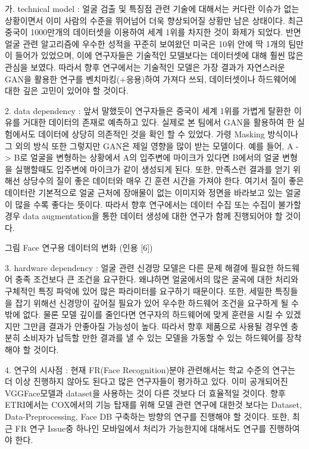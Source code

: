 \documentclass{oblivoir}
\begin{document}
가. technical model : 얼굴 검출 및 특징점 관련 기술에 대해서는 커다란 이슈가 없는 상황이면서 이미 사람의 수준을 뛰어넘어 더욱 향상되어질 상황만 남은 상태이다. 최근 중국이 1000만개의 데이터셋을 이용하여 세계 1위를 차지한 것이 화제가 되었다. 반면 얼굴 관련 알고리즘에 우수한 성적을 꾸준히 보여왔던 미국은 10위 안에 딱 1개의 팀만이 들어가 있었으며, 이에 연구자들은 기술적인 모델보다는 데이터셋에 대해 훨씬 많은 관심을 보였다. 따라서 향후 연구에서는 기술적인 모델은 가장 결과가 자연스러운 GAN을 활용한 연구를 벤치마킹(+응용)하여 가져다 쓰되, 데이터셋이나 하드웨어에 대한 깊은 고민이 있어야 할 것이다.

2. data dependency : 앞서 말했듯이 연구자들은 중국이 세계 1위를 가볍게 탈환한 이유를 거대한 데이터의 존재로 예측하고 있다. 실제로 본 팀에서 GAN을 활용하여 한 실험에서도 데이터에 상당히 의존적인 것을 확인 할 수 있었다. 가령 Masking 방식이나 그 외의 방식 또한 그렇지만 GAN은 제일 영향을 많이 받는 모델이다. 예를 들어, A -> B로 얼굴을 변형하는 상황에서 A의 입주변에 마이크가 있다면 B에서의 얼굴 변형을 실행할때도 입주변에 마이크가 같이 생성되게 된다. 또한, 만족스런 결과를 얻기 위해선 상당수의 질이 좋은 데이터와 매우 긴 훈련 시간을 가져야 한다. 여기서 질이 좋은 데이터란 기본적으로 얼굴 근처에 장애물이 없는 이미지와 정면을 바라보고 있는 얼굴이 많을 수록 좋다는 뜻이다. 따라서 향후 연구에서는 데이터 수집 또는 수집이 불가할 경우 data augmentation을 통한 데이터 생성에 대한 연구가 함께 진행되어야 할 것이다.

그림  Face 연구용 데이터의 변화 (인용 [6])

3. hardware dependency : 얼굴 관련 신경망 모델은 다른 문제 해결에 필요한 하드웨어 충족 조건보다 큰 조건을 요구한다. 왜냐하면 얼굴에서의 많은 굴곡에 대한 처리와 구체적인 특징 파악에 있어 많은 파라미터를 요구하기 때문이다. 또한, 세밀한 특징들을 잡기 위해선 신경망이 깊어질 필요가 있어 우수한 하드웨어 조건을 요구하게 될 수 밖에 없다. 물론 모델 깊이를 줄인다면 연구자의 하드웨어에 맞게 훈련을 시킬 수 있겠지만 그만큼 결과가 안좋아질 가능성이 높다. 따라서 향후 제품으로 사용될 경우엔 충분히 소비자가 납득할 만한 결과를 낼 수 있는 모델을 가동할 수 있는 하드웨어를 장착해야 할 것이다. 

4. 연구의 시사점 : 현재 FR(Face Recognition)분야 관련해서는 학교 수준의 연구는 더 이상 진행하지 않아도 된다고 많은 연구자들이 평가하고 있다. 이미 공개되어진 VGGFace모델과 dataset을 사용하는 것이 다른 것보다 더 효율적일 것이다. 향후 ETRI에서는 COX에서의 기능 탑재를 위해 모델 관련 연구에 대한것 보다는 Dataset, Data-Preprocessing, Face DB 구축하는 방향의 연구를 진행해야 할 것이다. 또한, 최근 FR 연구 Issue중 하나인 모바일에서 처리가 가능한지에 대해서도 연구를 진행하여야 한다.
\end{document}
